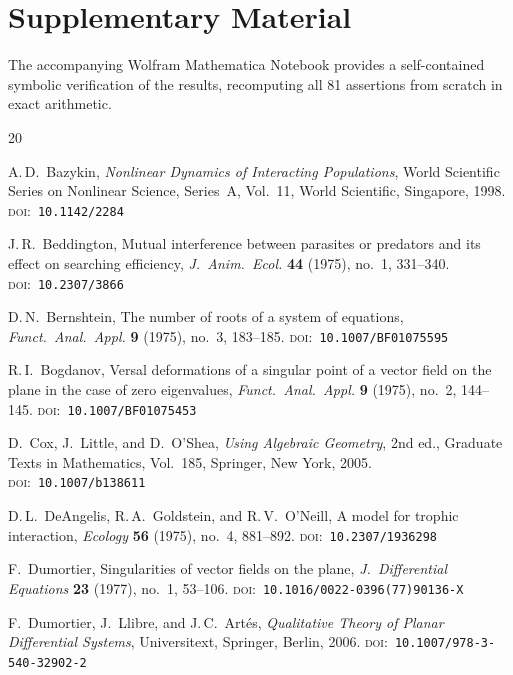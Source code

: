 \documentclass[12pt]{article}
\theoremstyle{plain}
\theoremstyle{definition}
\theoremstyle{remark}
\newcommand{\doi}[1]{\textsc{doi:}~\texttt{#1}}
\begin{document}
	\section*{Supplementary Material}
	The accompanying Wolfram Mathematica Notebook provides a self-contained
	symbolic verification of the results, recomputing all 81 assertions
	from scratch in exact arithmetic.
	\begin{thebibliography}{20}
		
		A.\,D.~Bazykin,
		\emph{Nonlinear Dynamics of Interacting Populations},
		World Scientific Series on Nonlinear Science, Series~A, Vol.~11,
		World Scientific, Singapore, 1998.
		\newblock \doi{10.1142/2284}
		
		J.\,R.~Beddington,
		Mutual interference between parasites or predators and its effect on
		searching efficiency,
		\emph{J.\ Anim.\ Ecol.} \textbf{44} (1975), no.~1, 331--340.
		\newblock \doi{10.2307/3866}
		
		D.\,N.~Bernshtein,
		The number of roots of a system of equations,
		\emph{Funct.\ Anal.\ Appl.} \textbf{9} (1975), no.~3, 183--185.
		\newblock \doi{10.1007/BF01075595}
		
		R.\,I.~Bogdanov,
		Versal deformations of a singular point of a vector field on the plane
		in the case of zero eigenvalues,
		\emph{Funct.\ Anal.\ Appl.} \textbf{9} (1975), no.~2, 144--145.
		\newblock \doi{10.1007/BF01075453}
		
		D.~Cox, J.~Little, and D.~O'Shea,
		\emph{Using Algebraic Geometry}, 2nd ed.,
		Graduate Texts in Mathematics, Vol.~185, Springer, New York, 2005.
		\newblock \doi{10.1007/b138611}
		
		D.\,L.~DeAngelis, R.\,A.~Goldstein, and R.\,V.~O'Neill,
		A model for trophic interaction,
		\emph{Ecology} \textbf{56} (1975), no.~4, 881--892.
		\newblock \doi{10.2307/1936298}
		
		F.~Dumortier,
		Singularities of vector fields on the plane,
		\emph{J.\ Differential Equations} \textbf{23} (1977), no.~1, 53--106.
		\newblock \doi{10.1016/0022-0396(77)90136-X}
		
		F.~Dumortier, J.~Llibre, and J.\,C.~Art\'es,
		\emph{Qualitative Theory of Planar Differential Systems},
		Universitext, Springer, Berlin, 2006.
		\newblock \doi{10.1007/978-3-540-32902-2}
		

\end{thebibliography}
\end{document}
